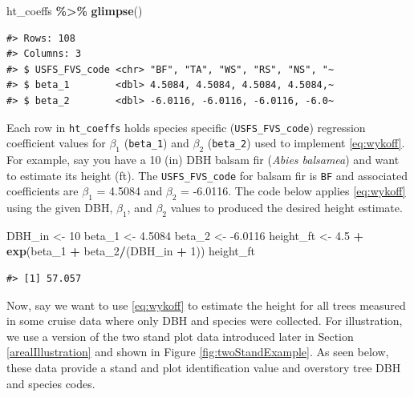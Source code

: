 \documentclass[
  11pt,
]{krantz}
\newenvironment{Shaded}{\begin{snugshade}}{\end{snugshade}}
\newcommand{\DecValTok}[1]{\textcolor[rgb]{0.00,0.00,0.81}{#1}}
\newcommand{\FloatTok}[1]{\textcolor[rgb]{0.00,0.00,0.81}{#1}}
\newcommand{\KeywordTok}[1]{\textcolor[rgb]{0.13,0.29,0.53}{\textbf{#1}}}
\newcommand{\NormalTok}[1]{#1}
\newcommand{\OperatorTok}[1]{\textcolor[rgb]{0.81,0.36,0.00}{\textbf{#1}}}
\newcommand{\StringTok}[1]{\textcolor[rgb]{0.31,0.60,0.02}{#1}}
\theoremstyle{definition}
\theoremstyle{definition}
\theoremstyle{definition}
\theoremstyle{definition}
\theoremstyle{remark}
\begin{document}
\begin{Shaded}
\begin{Highlighting}[]
\NormalTok{ht\_coeffs }\OperatorTok{\%\textgreater{}\%}\StringTok{ }\KeywordTok{glimpse}\NormalTok{()}
\end{Highlighting}
\end{Shaded}

\begin{verbatim}
#> Rows: 108
#> Columns: 3
#> $ USFS_FVS_code <chr> "BF", "TA", "WS", "RS", "NS", "~
#> $ beta_1        <dbl> 4.5084, 4.5084, 4.5084, 4.5084,~
#> $ beta_2        <dbl> -6.0116, -6.0116, -6.0116, -6.0~
\end{verbatim}

Each row in \texttt{ht\_coeffs} holds species specific (\texttt{USFS\_FVS\_code}) regression coefficient values for \(\beta_1\) (\texttt{beta\_1}) and \(\beta_2\) (\texttt{beta\_2}) used to implement \eqref{eq:wykoff}. For example, say you have a 10 (in) DBH balsam fir (\emph{Abies balsamea}) and want to estimate its height (ft). The \texttt{USFS\_FVS\_code} for balsam fir is \texttt{BF} and associated coefficients are \(\beta_1\) = 4.5084 and \(\beta_2\) = -6.0116. The code below applies \eqref{eq:wykoff} using the given DBH, \(\beta_1\), and \(\beta_2\) values to produced the desired height estimate.

\begin{Shaded}
\begin{Highlighting}[]
\NormalTok{DBH\_in \textless{}{-}}\StringTok{ }\DecValTok{10}
\NormalTok{beta\_}\DecValTok{1}\NormalTok{ \textless{}{-}}\StringTok{ }\FloatTok{4.5084}
\NormalTok{beta\_}\DecValTok{2}\NormalTok{ \textless{}{-}}\StringTok{ }\FloatTok{{-}6.0116}
\NormalTok{height\_ft \textless{}{-}}\StringTok{ }\FloatTok{4.5} \OperatorTok{+}\StringTok{ }\KeywordTok{exp}\NormalTok{(beta\_}\DecValTok{1} \OperatorTok{+}\StringTok{ }\NormalTok{beta\_}\DecValTok{2}\OperatorTok{/}\NormalTok{(DBH\_in }\OperatorTok{+}\StringTok{ }\DecValTok{1}\NormalTok{))}
\NormalTok{height\_ft}
\end{Highlighting}
\end{Shaded}

\begin{verbatim}
#> [1] 57.057
\end{verbatim}

Now, say we want to use \eqref{eq:wykoff} to estimate the height for all trees measured in some cruise data where only DBH and species were collected. For illustration, we use a version of the two stand plot data introduced later in Section \ref{arealIllustration} and shown in Figure \ref{fig:twoStandExample}. As seen below, these data provide a stand and plot identification value and overstory tree DBH and species codes.
\end{document}

